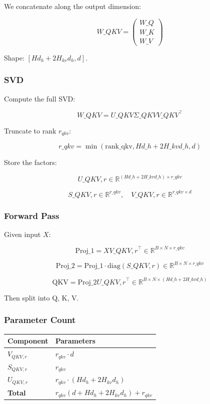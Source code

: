 We concatenate along the output dimension:

\[
W\_{QKV} = \begin{pmatrix} W\_Q \\ W\_K \\ W\_V \end{pmatrix}
\]

Shape: $[H d_h + 2 H_{kv} d_h, d]$.

\subsubsection{SVD}

Compute the full SVD:

\[
W\_{QKV} = U\_{QKV} \Sigma\_{QKV} V\_{QKV}^\top
\]

Truncate to rank $r_{qkv}$:

\[
r\_{qkv} = \min(\text{rank\_qkv}, H d\_h + 2 H\_{kv} d\_h, d)
\]

Store the factors:

\[
U\_{QKV, r} \in \mathbb{R}^{(H d\_h + 2 H\_{kv} d\_h) \times r\_{qkv}}
\]

\[
S\_{QKV, r} \in \mathbb{R}^{r\_{qkv}}, \quad
V\_{QKV, r} \in \mathbb{R}^{r\_{qkv} \times d}
\]

\subsubsection{Forward Pass}

Given input $X$:

\[
\text{Proj}\_1 = X V\_{QKV, r}^\top \in \mathbb{R}^{B \times N \times r\_{qkv}}
\]

\[
\text{Proj}\_2 = \text{Proj}\_1 \cdot \text{diag}(S\_{QKV, r}) \in \mathbb{R}^{B \times N \times r\_{qkv}}
\]

\[
\text{QKV} = \text{Proj}\_2 U\_{QKV, r}^\top \in \mathbb{R}^{B \times N \times (H d\_h + 2 H\_{kv} d\_h)}
\]

Then split into Q, K, V.

\subsubsection{Parameter Count}

\begin{table}[H]
\centering
\small
\begin{tabular}{ll}
\toprule
\textbf{Component} & \textbf{Parameters} \\
\midrule
$V_{QKV, r}$ & $r_{qkv} \cdot d$ \\
$S_{QKV, r}$ & $r_{qkv}$ \\
$U_{QKV, r}$ & $r_{qkv} \cdot (H d_h + 2 H_{kv} d_h)$ \\
\textbf{Total} & $r_{qkv} (d + H d_h + 2 H_{kv} d_h) + r_{qkv}$ \\
\bottomrule
\end{tabular}
\end{table}

